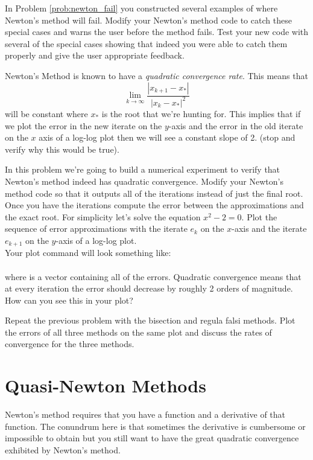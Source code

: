 \begin{problem}
    In Problem \ref{prob:newton_fail} you constructed several examples of where Newton's
    method will fail.  Modify your Newton's method code
    to catch these special cases and warns the user before the method fails.  Test your
    new code with several of the special cases showing that indeed you were able to catch
    them properly and give the user appropriate feedback.
\end{problem}


\begin{problem}\label{prob:newton_convergence}
    Newton's Method is known to have a {\it quadratic convergence rate}.  This means that 
    \[ \lim_{k \to \infty} \frac{|x_{k+1} - x_*|}{|x_k - x_*|^2} \]
    will be constant where $x_*$ is the root that we're hunting for.  This implies that
    if we plot the error in the new iterate on the $y$-axis and the error in the old
    iterate on the $x$ axis of a log-log plot then we will see a constant slope of 2.
    (stop and verify why this would be true).
    
    In this problem we're going to build a numerical experiment to verify that Newton's
    method indeed has quadratic convergence.  Modify your Newton's method code so that it
    outputs all of the iterations instead of just the final root.  Once you have the
    iterations compute the error between the approximations and the exact root. For
    simplicity let's solve the equation $x^2-2=0$.  Plot the sequence of error
    approximations with the iterate $e_k$ on the $x$-axis and the iterate $e_{k+1}$ on the
    $y$-axis of a log-log plot.  \\ Your plot command will look something like: \\
     \\where {} is a vector
    containing all of the errors.  Quadratic convergence means that at every iteration the
    error should decrease by roughly 2 orders of magnitude.  How can you see this in your
    plot?
\end{problem}


\begin{problem}
    Repeat the previous problem with the bisection and regula falsi
    methods.  Plot the errors of all three methods on the same plot and discuss the rates
    of convergence for the three methods.
\end{problem}


\newpage\section{Quasi-Newton Methods}
Newton's method requires that you have a function and a derivative of that function.  The
conundrum here is that sometimes the derivative is cumbersome or impossible to obtain but
you still want to have the great quadratic convergence exhibited by Newton's method.

